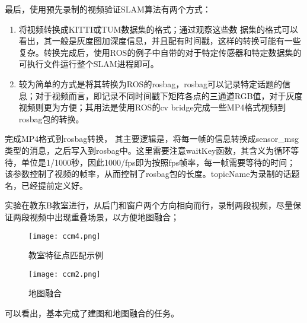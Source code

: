 最后，使用预先录制的视频验证SLAM算法有两个方式：

\begin{enumerate}
	\item 将视频转换成KITTI或TUM数据集的格式；通过观察这些数
	据集的格式可以看出，其一般是灰度图加深度信息，并且配有时间戳，这样的转换可能有一些复杂。转换完成后，使用ROS的例子中自带的对于特定传感器和特定数据集的可执行文件运行整个SLAM进程即可。
	\item 较为简单的方式是将其转换为ROS的rosbag，rosbag可以记录特定话题的信息；对于视频而言，即记录不同时间戳下矩阵各点的三通道RGB值，对于灰度视频则更为方便；其用法是使用ROS的cv bridge完成一些MP4格式视频到rosbag包的转换。
\end{enumerate}

完成MP4格式到rosbag转换，
其主要逻辑是，将每一帧的信息转换成sensor\_msg类型的消息，之后写入到rosbag中。这里需要注意waitKey函数，其含义为循环等待，单位是1/1000秒，因此1000/fps即为按照fps帧率，每一帧需要等待的时间；该参数控制了视频的帧率，从而控制了rosbag包的长度。topicName为录制的话题名，已经提前定义好。

实验在教东B教室进行，从后门和窗户两个方向相向而行，录制两段视频，尽量保证两段视频中出现重叠场景，以方便地图融合；
\begin{figure}[htbp]
	\centering
	\begin{minipage}[t]{0.45\columnwidth} %
		\centering
		\texttt{[image: ccm4.png]}
		\caption{教室特征点匹配示例}
		\label{fig5-1}
	\end{minipage}
	\begin{minipage}[t]{0.45\columnwidth}
		\centering
		\texttt{[image: ccm2.png]}
		\caption{地图融合}
		\label{fig5-2}
	\end{minipage}
\end{figure}

可以看出，基本完成了建图和地图融合的任务。